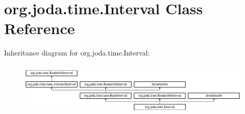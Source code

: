 \hypertarget{classorg_1_1joda_1_1time_1_1_interval}{\section{org.\-joda.\-time.\-Interval Class Reference}
\label{classorg_1_1joda_1_1time_1_1_interval}
}
Inheritance diagram for org.\-joda.\-time.\-Interval\-:\begin{figure}[H]
\begin{center}
\leavevmode
\includegraphics[height=2.580645cm]{classorg_1_1joda_1_1time_1_1_interval}
\end{center}
\end{figure}
